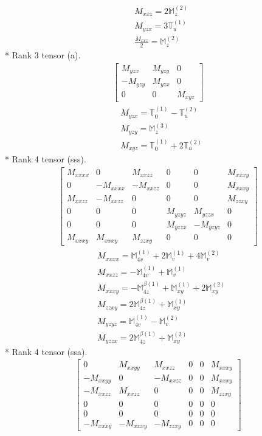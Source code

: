 \documentclass[fleqn,8pt,landscape]{jsarticle}
\begin{document}
\begin{align*}
& M_{xxz} = 2 \mathbb{M}_{z}^{(2)} \\
& M_{yzx} = 3 \mathbb{T}_{u}^{(1)} \\
& \frac{M_{xxz}}{2} = \mathbb{M}_{z}^{(2)}
\end{align*}
* Rank 3 tensor (a).
\begin{align*}
\begin{bmatrix} M_{yzx} & M_{yzy} & 0 \\ - M_{yzy} & M_{yzx} & 0 \\ 0 & 0 & M_{xyz} \end{bmatrix}
\end{align*}
\begin{align*}
& M_{yzx} = \mathbb{T}_{0}^{(1)} - \mathbb{T}_{u}^{(2)} \\
& M_{yzy} = \mathbb{M}_{z}^{(3)} \\
& M_{xyz} = \mathbb{T}_{0}^{(1)} + 2 \mathbb{T}_{u}^{(2)}
\end{align*}
* Rank 4 tensor (sss).
\begin{align*}
\begin{bmatrix} M_{xxxx} & 0 & M_{xxzz} & 0 & 0 & M_{xxxy} \\ 0 & - M_{xxxx} & - M_{xxzz} & 0 & 0 & M_{xxxy} \\ M_{xxzz} & - M_{xxzz} & 0 & 0 & 0 & M_{zzxy} \\ 0 & 0 & 0 & M_{yzyz} & M_{yzzx} & 0 \\ 0 & 0 & 0 & M_{yzzx} & - M_{yzyz} & 0 \\ M_{xxxy} & M_{xxxy} & M_{zzxy} & 0 & 0 & 0 \end{bmatrix}
\end{align*}
\begin{align*}
& M_{xxxx} = \mathbb{M}_{4v}^{(1)} + 2 \mathbb{M}_{v}^{(1)} + 4 \mathbb{M}_{v}^{(2)} \\
& M_{xxzz} = - \mathbb{M}_{4v}^{(1)} + \mathbb{M}_{v}^{(1)} \\
& M_{xxxy} = - \mathbb{M}_{4z}^{\beta(1)} + \mathbb{M}_{xy}^{(1)} + 2 \mathbb{M}_{xy}^{(2)} \\
& M_{zzxy} = 2 \mathbb{M}_{4z}^{\beta(1)} + \mathbb{M}_{xy}^{(1)} \\
& M_{yzyz} = \mathbb{M}_{4v}^{(1)} - \mathbb{M}_{v}^{(2)} \\
& M_{yzzx} = 2 \mathbb{M}_{4z}^{\beta(1)} + \mathbb{M}_{xy}^{(2)}
\end{align*}
* Rank 4 tensor (ssa).
\begin{align*}
\begin{bmatrix} 0 & M_{xxyy} & M_{xxzz} & 0 & 0 & M_{xxxy} \\ - M_{xxyy} & 0 & - M_{xxzz} & 0 & 0 & M_{xxxy} \\ - M_{xxzz} & M_{xxzz} & 0 & 0 & 0 & M_{zzxy} \\ 0 & 0 & 0 & 0 & 0 & 0 \\ 0 & 0 & 0 & 0 & 0 & 0 \\ - M_{xxxy} & - M_{xxxy} & - M_{zzxy} & 0 & 0 & 0 \end{bmatrix}
\end{align*}
\end{document}
